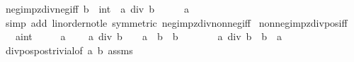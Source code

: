 \begin{isabellebody}
\endisatagproof
{\isafoldproof}%
%
\isadelimproof
\isanewline
%
\endisadelimproof
\isanewline
\isanewline
{}\isamarkupfalse%
\ neg{\isacharunderscore}{\kern0pt}imp{\isacharunderscore}{\kern0pt}zdiv{\isacharunderscore}{\kern0pt}neg{\isacharunderscore}{\kern0pt}iff{\isacharcolon}{\kern0pt}\ {\isachardoublequoteopen}b\ {\isacharless}{\kern0pt}\ {\isacharparenleft}{\kern0pt}{}{\isacharcolon}{\kern0pt}{\isacharcolon}{\kern0pt}int{\isacharparenright}{\kern0pt}\ {\isacharequal}{\kern0pt}{\isacharequal}{\kern0pt}{\isachargreater}{\kern0pt}\ {\isacharparenleft}{\kern0pt}a\ div\ b\ {\isacharless}{\kern0pt}\ {}{\isacharparenright}{\kern0pt}\ {\isacharequal}{\kern0pt}\ {\isacharparenleft}{\kern0pt}{}\ {\isacharless}{\kern0pt}\ a{\isacharparenright}{\kern0pt}{\isachardoublequoteclose}\isanewline
%
\isadelimproof
\ \ %
\endisadelimproof
%
\isatagproof
{}\isamarkupfalse%
\ {\isacharparenleft}{\kern0pt}simp\ add{\isacharcolon}{\kern0pt}\ linorder{\isacharunderscore}{\kern0pt}not{\isacharunderscore}{\kern0pt}le\ {\isacharbrackleft}{\kern0pt}symmetric{\isacharbrackright}{\kern0pt}\ neg{\isacharunderscore}{\kern0pt}imp{\isacharunderscore}{\kern0pt}zdiv{\isacharunderscore}{\kern0pt}nonneg{\isacharunderscore}{\kern0pt}iff{\isacharparenright}{\kern0pt}%
\endisatagproof
{\isafoldproof}%
%
\isadelimproof
\isanewline
%
\endisadelimproof
\isanewline
{}\isamarkupfalse%
\ nonneg{}{\isacharunderscore}{\kern0pt}imp{\isacharunderscore}{\kern0pt}zdiv{\isacharunderscore}{\kern0pt}pos{\isacharunderscore}{\kern0pt}iff{\isacharcolon}{\kern0pt}\isanewline
\ \ \ a{\isacharcolon}{\kern0pt}{\isacharcolon}{\kern0pt}int\isanewline
\ \ \ {\isachardoublequoteopen}{}\ {\isasymle}\ a{\isachardoublequoteclose}\ \isanewline
\ \ \ {\isachardoublequoteopen}a\ div\ b\ {\isachargreater}{\kern0pt}\ {}\ {\isasymlongleftrightarrow}\ a\ {\isasymge}\ b\ {\isasymand}\ b{\isachargreater}{\kern0pt}{}{\isachardoublequoteclose}\isanewline
%
\isadelimproof
%
\endisadelimproof
%
\isatagproof
{}\isamarkupfalse%
\ {\isacharminus}{\kern0pt}\isanewline
\ \ \isamarkupfalse%
\ {\isachardoublequoteopen}{}\ {\isacharless}{\kern0pt}\ a\ div\ b\ {\isasymLongrightarrow}\ b\ {\isasymle}\ a{\isachardoublequoteclose}\isanewline
\ \ \ \ \isamarkupfalse%
\ div{\isacharunderscore}{\kern0pt}pos{\isacharunderscore}{\kern0pt}pos{\isacharunderscore}{\kern0pt}trivial{\isacharbrackleft}{\kern0pt}of\ a\ b{\isacharbrackright}{\kern0pt}\ assms\ \isamarkupfalse%

\end{isabellebody}
